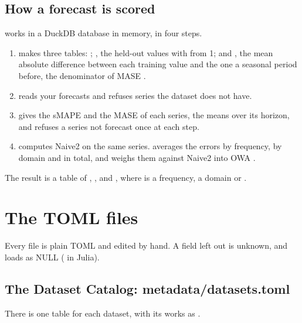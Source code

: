 \subsection{How a forecast is scored}

 works in a DuckDB database in memory, in four steps.
\begin{enumerate}
  \item {} makes three tables: ; , the held-out values with 
    from 1; and , the mean absolute difference between each training value and the one a seasonal period
    before, the denominator of MASE .
  \item {} reads your forecasts and refuses series the dataset does not have.
  \item {} gives the sMAPE and the MASE of each series, the means over its horizon, and refuses a series
    not forecast once at each step.
  \item {} computes Naive2 on the same series.  averages the errors by frequency, by
    domain and in total, and weighs them against Naive2 into OWA
    .
\end{enumerate}

The result is a table of , ,  and , where  is a
frequency, a domain or .

\section{The TOML files}
\label{sec:toml}

Every file is plain TOML and edited by hand. A field left out is unknown, and loads as NULL ( in Julia).

\subsection{The Dataset Catalog: metadata/datasets.toml}

There is one \file{[[datasets]]} table for each dataset, with its works as .

